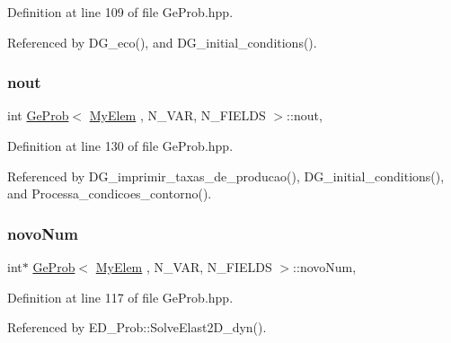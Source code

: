 Definition at line 109 of file Ge\+Prob.\+hpp.



Referenced by D\+G\+\_\+eco(), and D\+G\+\_\+initial\+\_\+conditions().

\mbox{\label{classGeProb_ae6ee447645542bcb3addd78e9896f546}} 
\subsubsection{\texorpdfstring{nout}{nout}}
{\footnotesize\ttfamily int \hyperlink{classGeProb}{Ge\+Prob}$<$ \hyperlink{DG__Prob_8h_a83cd887ced9a6587428f267e50cd4787}{My\+Elem} , N\+\_\+\+V\+AR, N\+\_\+\+F\+I\+E\+L\+DS $>$\+::nout\hspace{0.3cm}{\ttfamily [protected]}, {\ttfamily [inherited]}}



Definition at line 130 of file Ge\+Prob.\+hpp.



Referenced by D\+G\+\_\+imprimir\+\_\+taxas\+\_\+de\+\_\+producao(), D\+G\+\_\+initial\+\_\+conditions(), and Processa\+\_\+condicoes\+\_\+contorno().

\mbox{\label{classGeProb_ab8ee4f31d624e14988e65a7cd5c6a457}} 
\subsubsection{\texorpdfstring{novo\+Num}{novoNum}}
{\footnotesize\ttfamily int$\ast$ \hyperlink{classGeProb}{Ge\+Prob}$<$ \hyperlink{DG__Prob_8h_a83cd887ced9a6587428f267e50cd4787}{My\+Elem} , N\+\_\+\+V\+AR, N\+\_\+\+F\+I\+E\+L\+DS $>$\+::novo\+Num\hspace{0.3cm}{\ttfamily [protected]}, {\ttfamily [inherited]}}



Definition at line 117 of file Ge\+Prob.\+hpp.



Referenced by E\+D\+\_\+\+Prob\+::\+Solve\+Elast2\+D\+\_\+dyn().

\mbox{\label{classGeProb_a579ca91b970ea46b1418310eaf5d8b31}} 
